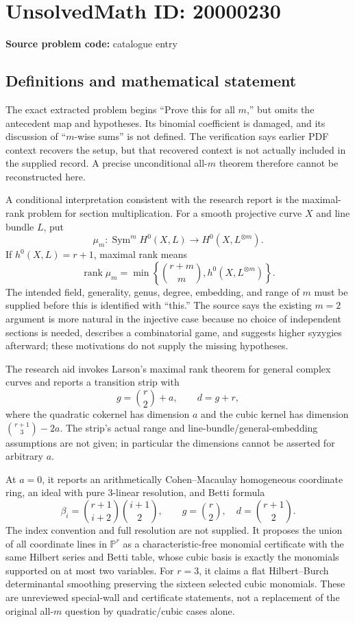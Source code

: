 \documentclass[11pt]{article}
\newcommand{\PP}{\mathbb{P}}
\begin{document}
\section*{UnsolvedMath ID: 20000230}
\textbf{Source problem code:} catalogue entry
\subsection{Definitions and mathematical statement}
The exact extracted problem begins ``Prove this for all $m$,'' but omits the antecedent map and hypotheses. Its binomial coefficient is damaged, and its discussion of ``$m$-wise sums'' is not defined. The verification says earlier PDF context recovers the setup, but that recovered context is not actually included in the supplied record. A precise unconditional all-$m$ theorem therefore cannot be reconstructed here.

A conditional interpretation consistent with the research report is the maximal-rank problem for section multiplication. For a smooth projective curve $X$ and line bundle $L$, put
\[
 \mu_m:\operatorname{Sym}^m H^0(X,L)\longrightarrow H^0(X,L^{\otimes m}).
\]
If $h^0(X,L)=r+1$, maximal rank means
\[
 \operatorname{rank}\mu_m
   =\min\left\{\binom{r+m}{m},h^0(X,L^{\otimes m})\right\}.
\]
The intended field, generality, genus, degree, embedding, and range of $m$ must be supplied before this is identified with ``this.'' The source says the existing $m=2$ argument is more natural in the injective case because no choice of independent sections is needed, describes a combinatorial game, and suggests higher syzygies afterward; these motivations do not supply the missing hypotheses.

The research aid invokes Larson's maximal rank theorem for general complex curves and reports a transition strip with
\[
 g=\binom r2+a,\qquad d=g+r,
\]
where the quadratic cokernel has dimension $a$ and the cubic kernel has dimension $\binom{r+1}{3}-2a$. The strip's actual range and line-bundle/general-embedding assumptions are not given; in particular the dimensions cannot be asserted for arbitrary $a$.

At $a=0$, it reports an arithmetically Cohen--Macaulay homogeneous coordinate ring, an ideal with pure $3$-linear resolution, and Betti formula
\[
 \beta_i=\binom{r+1}{i+2}\binom{i+1}{2},\qquad
 g=\binom r2,\quad d=\binom{r+1}{2}.
\]
The index convention and full resolution are not supplied. It proposes the union of all coordinate lines in $\PP^r$ as a characteristic-free monomial certificate with the same Hilbert series and Betti table, whose cubic basis is exactly the monomials supported on at most two variables. For $r=3$, it claims a flat Hilbert--Burch determinantal smoothing preserving the sixteen selected cubic monomials. These are unreviewed special-wall and certificate statements, not a replacement of the original all-$m$ question by quadratic/cubic cases alone.
\end{document}
